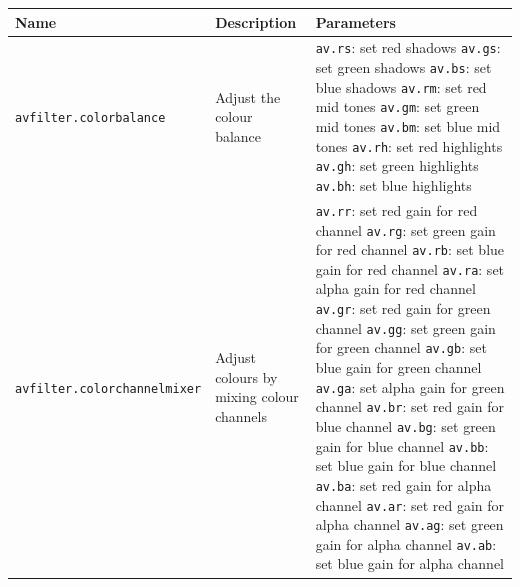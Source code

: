 \documentclass[../MasterThesis.tex]{subfiles}
\begin{document}
\begin{table}[H]
	\footnotesize
	\begin{tabular}{lp{4.4cm}p{4.5cm}}
		\toprule
		Name & Description & Parameters \\
		\midrule
		\texttt{avfilter.colorbalance} & Adjust the colour balance & 
		\tiny{
		\texttt{av.rs}: set red shadows \newline 
		\texttt{av.gs}: set green shadows \newline 
		\texttt{av.bs}: set blue shadows \newline 
		\texttt{av.rm}: set red mid tones \newline 
		\texttt{av.gm}: set green mid tones \newline 
		\texttt{av.bm}: set blue mid tones \newline 
		\texttt{av.rh}: set red highlights \newline 
		\texttt{av.gh}: set green highlights \newline 
		\texttt{av.bh}: set blue highlights}
		\\
		\texttt{avfilter.colorchannelmixer} & Adjust colours by mixing colour channels & 
		\tiny{
		\texttt{av.rr}: set red gain for red channel \newline 
		\texttt{av.rg}: set green gain for red channel \newline 
		\texttt{av.rb}: set blue gain for red channel \newline 
		\texttt{av.ra}: set alpha gain for red channel \newline 
		\texttt{av.gr}: set red gain for green channel \newline 
		\texttt{av.gg}: set green gain for green channel \newline 
		\texttt{av.gb}: set blue gain for green channel \newline 
		\texttt{av.ga}: set alpha gain for green channel \newline 
		\texttt{av.br}: set red gain for blue channel \newline 
		\texttt{av.bg}: set green gain for blue channel \newline 
		\texttt{av.bb}: set blue gain for blue channel \newline 
		\texttt{av.ba}: set red gain for alpha channel \newline 
		\texttt{av.ar}: set red gain for alpha channel \newline 
		\texttt{av.ag}: set green gain for alpha channel \newline 
		\texttt{av.ab}: set blue gain for alpha channel \newline 
}
\end{tabular}
\end{table}
\end{document}
